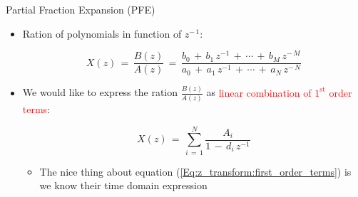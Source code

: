\documentclass{beamer}
\begin{document}
\begin{frame}[t]{Partial Fraction Expansion (PFE)}


\begin{itemize}

\item Ration of polynomials in function of $z^{- \, 1}$:

	\begin{equation}
	X(z) \, = \, \displaystyle\frac{B(z)}{A(z)}   \, = \, \displaystyle\frac{b_0 \, + \, b_1 \, z^{-1} \, + \, \cdots \, + \, b_M \, z^{- \, M}}{a_0 \, + \, a_1 \, z^{-1} \, + \, \cdots \, + \, a_N \, z^{- \, N}}
	\end{equation}

\item We would like to express the ration $\displaystyle\frac{B(z)}{A(z)}$ as \textcolor{red}{linear combination of $1^{\mathrm{st}}$ order terms}:

	\begin{equation}
	X(z) \, = \, \displaystyle\sum\limits_{i \, = \, 1}^N\frac{A_i}{1 \, - \, d_i \, z^{-1}}
	\label{Eq:z_transform:first_order_terms}
	\end{equation}
	
	\begin{itemize}
	\item The nice thing about equation (\autoref{Eq:z_transform:first_order_terms}) is we know their time domain expression
	\end{itemize}

\end{itemize}

\end{frame}
\end{document}
